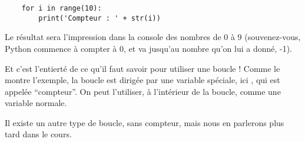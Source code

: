 \begin{lstlisting}
    for i in range(10):
        print('Compteur : ' + str(i))
\end{lstlisting}

Le résultat sera l'impression dans la console des nombres de 0 à 9 (souvenez-vous, Python commence à compter à 0, et va jusqu'au nombre qu'on lui a donné, -1).

Et c'est l'entierté de ce qu'il faut savoir pour utiliser une boucle  ! Comme le montre l'exemple, la boucle est dirigée par une variable spéciale, ici , qui est appelée ``compteur''. On peut l'utiliser, à l'intérieur de la boucle, comme une variable normale.

Il existe un autre type de boucle, sans compteur, mais nous en parlerons plus tard dans le cours.
